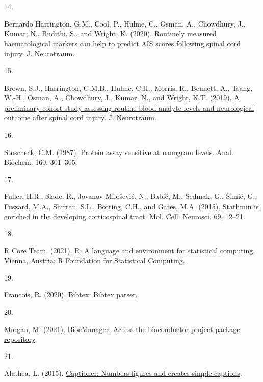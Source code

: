 \documentclass[
]{article}
\newlength{\cslhangindent}
\newlength{\csllabelwidth}
\newlength{\cslentryspacingunit} %
\newenvironment{CSLReferences}[2] %
 {%
  \setlength{\parindent}{0pt}
  \ifodd #1
  \let\oldpar\par
  \def\par{\hangindent=\cslhangindent\oldpar}
  \fi
  \setlength{\parskip}{#2\cslentryspacingunit}
 }%
 {}
\newcommand{\CSLLeftMargin}[1]{\parbox[t]{\csllabelwidth}{#1}}
\newcommand{\CSLRightInline}[1]{\parbox[t]{\linewidth - \csllabelwidth}{#1}\break}
\begin{document}
\begin{CSLReferences}{0}{0}
\leavevmode{}%
\CSLLeftMargin{14. }
\CSLRightInline{Bernardo Harrington, G.M., Cool, P., Hulme, C., Osman, A., Chowdhury, J., Kumar, N., Budithi, S., and Wright, K. (2020). \href{https://doi.org/10.1089/neu.2020.7144}{Routinely measured haematological markers can help to predict {AIS} scores following spinal cord injury}. J. Neurotraum.}

\leavevmode{}%
\CSLLeftMargin{15. }
\CSLRightInline{Brown, S.J., Harrington, G.M.B., Hulme, C.H., Morris, R., Bennett, A., Tsang, W.-H., Osman, A., Chowdhury, J., Kumar, N., and Wright, K.T. (2019). \href{https://doi.org/10.1089/neu.2019.6495}{A preliminary cohort study assessing routine blood analyte levels and neurological outcome after spinal cord injury}. J. Neurotraum.}

\leavevmode{}%
\CSLLeftMargin{16. }
\CSLRightInline{Stoscheck, C.M. (1987). \href{https://doi.org/10.1016/0003-2697(87)90051-0}{Protein assay sensitive at nanogram levels}. Anal. Biochem. 160, 301--305.}

\leavevmode{}%
\CSLLeftMargin{17. }
\CSLRightInline{Fuller, H.R., Slade, R., Jovanov-Milošević, N., Babić, M., Sedmak, G., Šimić, G., Fuszard, M.A., Shirran, S.L., Botting, C.H., and Gates, M.A. (2015). \href{https://doi.org/10.1016/j.mcn.2015.09.003}{Stathmin is enriched in the developing corticospinal tract}. Mol. Cell. Neurosci. 69, 12--21.}

\leavevmode{}%
\CSLLeftMargin{18. }
\CSLRightInline{R Core Team. (2021). \href{https://www.R-project.org/}{R: A language and environment for statistical computing}. Vienna, Austria: R Foundation for Statistical Computing.}

\leavevmode{}%
\CSLLeftMargin{19. }
\CSLRightInline{Francois, R. (2020). \href{https://CRAN.R-project.org/package=bibtex}{Bibtex: Bibtex parser}.}

\leavevmode{}%
\CSLLeftMargin{20. }
\CSLRightInline{Morgan, M. (2021). \href{https://CRAN.R-project.org/package=BiocManager}{BiocManager: Access the bioconductor project package repository}.}

\leavevmode{}%
\CSLLeftMargin{21. }
\CSLRightInline{Alathea, L. (2015). \href{https://CRAN.R-project.org/package=captioner}{Captioner: Numbers figures and creates simple captions}.}


\end{CSLReferences}
\end{document}
